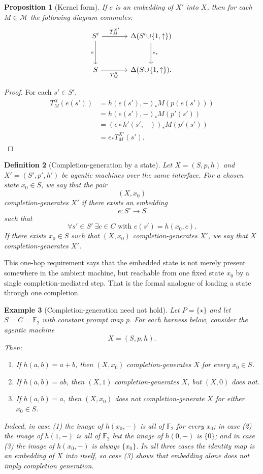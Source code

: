 \documentclass[11pt]{article}
\newtheorem{definition}{Definition}[section]
\newtheorem{proposition}[definition]{Proposition}
\newtheorem{example}[definition]{Example}
\begin{document}
\begin{proposition}[Kernel form]\label{prop:kernel-form}
If $e$ is an embedding of $X'$ into $X$, then for each $M\in\mathcal{M}$ the following diagram commutes:
\[
\begin{tikzcd}[column sep=3.6em,row sep=3.0em]
S' \arrow[r,"T_M^{X'}"] \arrow[d,"e"'] & \Delta(S'\!\cup\!\{1,\uparrow\}) \arrow[d,"e_*"] \\
S \arrow[r,"T_M^{X}"'] & \Delta(S\!\cup\!\{1,\uparrow\}).
\end{tikzcd}
\]
\end{proposition}

\begin{proof}
For each $s'\in S'$,
\begin{align*}
T_M^X(e(s'))
&=h(e(s'),-)_{*}M(p(e(s')))\\
&=h(e(s'),-)_{*}M(p'(s'))\\
&=(e\circ h'(s',-))_*M(p'(s'))\\
&=e_*T_M^{X'}(s').
\end{align*}
\end{proof}

\begin{definition}[Completion-generation by a state]\label{def:completion-generate}
Let $X=(S,p,h)$ and $X'=(S',p',h')$ be agentic machines over the same interface. For a chosen state $x_0\in S$, we say that the pair
\[
(X,x_0)
\]
\emph{completion-generates} $X'$ if there exists an embedding
\[
e:S'\to S
\]
such that
\[
\forall s'\in S'\ \exists c\in C\text{ with } e(s')=h(x_0,c).
\]
If there exists $x_0\in S$ such that $(X,x_0)$ completion-generates $X'$, we say that $X$ \emph{completion-generates} $X'$.
\end{definition}

This one-hop requirement says that the embedded state is not merely present somewhere in the ambient machine, but reachable from one fixed state $x_0$ by a single completion-mediated step. That is the formal analogue of loading a state through one completion.

\begin{example}[Completion-generation need not hold]\label{ex:seeds}
Let $P=\{\star\}$ and let $S=C=\mathbb{F}_2$ with constant prompt map $p$. For each harness below, consider the agentic machine
\[
X=(S,p,h).
\]
Then:
\begin{enumerate}[label=(\arabic*)]
    \item If $h(a,b)=a+b$, then $(X,x_0)$ completion-generates $X$ for every $x_0\in S$.
    \item If $h(a,b)=ab$, then $(X,1)$ completion-generates $X$, but $(X,0)$ does not.
    \item If $h(a,b)=a$, then $(X,x_0)$ does not completion-generate $X$ for either $x_0\in S$.
\end{enumerate}
Indeed, in case (1) the image of $h(x_0,-)$ is all of $\mathbb{F}_2$ for every $x_0$; in case (2) the image of $h(1,-)$ is all of $\mathbb{F}_2$ but the image of $h(0,-)$ is $\{0\}$; and in case (3) the image of $h(x_0,-)$ is always $\{x_0\}$. In all three cases the identity map is an embedding of $X$ into itself, so case (3) shows that embedding alone does not imply completion generation.
\end{example}
\end{document}

